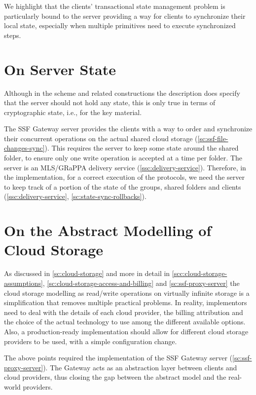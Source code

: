We highlight that the clients' transactional state management problem
is particularly bound to the server 
providing a way for clients to synchronize
their local state,
especially when multiple primitives need to execute
synchronized steps.


\section{On Server State}\label{sc:gap-synchronization-server-state}

Although in the scheme and related constructions the description
does specify that the server should not hold any state,
this is only true in terms of cryptographic state, i.e., for
the key material.

The SSF Gateway server provides the clients with a way to order and synchronize
their concurrent operations on the actual shared cloud storage (\cref{sc:ssf-file-changes-sync}).
This requires the server to keep some state around the shared folder,
to ensure only one write operation is accepted at a time per folder.
The server is an MLS/GRaPPA delivery service (\cref{ssc:delivery-service}).
Therefore, in the implementation, for a correct execution of the protocols, 
we need the server
to keep track of a portion of the state of the groups,
shared folders and clients (\cref{ssc:delivery-service}, \cref{sc:state-sync-rollbacks}).


\section{On the Abstract Modelling of Cloud Storage}\label{sc:gap-abstract-cloud-storage}

As discussed in \cref{sc:cloud-storage} and more in detail in 
\cref{scc:cloud-storage-assumptions},
\cref{sc:cloud-storage-access-and-billing}
and \cref{sc:ssf-proxy-server} the cloud storage modelling
as read/write operations on virtually infinite storage
is a simplification that removes multiple practical problems. 
In reality, implementors need to
deal with the details of each cloud provider, the billing attribution
and the choice of the actual technology to use among
the different available options.
Also, a production-ready
implementation should allow for different cloud storage
providers to be used, with a simple configuration change.

The above points required the implementation of the
SSF Gateway server (\cref{sc:ssf-proxy-server}).
The Gateway acts as an abstraction layer between clients
and cloud providers, thus closing the gap
between the abstract model and the real-world providers.

